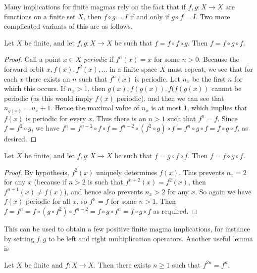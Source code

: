 Many implications for finite magmas rely on the fact that if $f, g:X \to X$ are functions on a finite set $X$, then $f \circ g = I$ if and only if $g \circ f = I$.  Two more complicated variants of this are as follows.

\begin{lemma}\label{ffg}  \leanok Let $X$ be finite, and let $f, g: X \to X$ be such that $f = f \circ f \circ g$.  Then $f = f \circ g \circ f$.
\end{lemma}

\begin{proof} \leanok Call a point $x \in X$ \emph{periodic} if $f^n(x) = x$ for some $n>0$.  Because the forward orbit $x, f(x), f^2(x), \dots$ in a finite space $X$ must repeat, we see that for each $x$ there exists an $n$ such that $f^n(x)$ is periodic.  Let $n_x$ be the first $n$ for which this occurs.  If $n_x > 1$, then $g(x), f(g(x)), f(f(g(x))$ cannot be periodic (as this would imply $f(x)$ periodic), and then we can see that $n_{g(x)} = n_x + 1$.  Hence the maximal value of $n_x$ is at most $1$, which implies that $f(x)$ is periodic for every $x$.  Thus there is an $n > 1$ such that $f^n = f$.  Since $f = f^2 \circ g$, we have $f^n = f^{n-2} \circ f \circ f = f^{n-2} \circ (f^2 \circ g) \circ f = f^n \circ g \circ f = f \circ g \circ f$, as desired.
\end{proof}

\begin{lemma}\label{gff}  \leanok Let $X$ be finite, and let $f, g: X \to X$ be such that $f = g \circ f \circ f$.  Then $f = f \circ g \circ f$.
\end{lemma}

\begin{proof} \leanok By hypothesis, $f^2(x)$ uniquely determines $f(x)$.  This prevents $n_x = 2$ for any $x$ (because if $n>2$ is such that $f^{n+2}(x) = f^2(x)$, then $f^{n+1}(x) \neq f(x)$), and hence also prevents $n_x > 2$ for any $x$.   So again we have $f(x)$ periodic for all $x$, so $f^n = f$ for some $n>1$.  Then $f = f^n = f \circ (g \circ f^2) \circ f^{n-2} = f \circ g \circ f^n = f \circ g \circ f$ as required.
\end{proof}

This can be used to obtain a few positive finite magma implications, for instance by setting $f,g$ to be left and right multiplication operators.  Another useful lemma is

\begin{lemma}\label{period}  \leanok  Let $X$ be finite and $f: X \to X$.  Then there exists $n \geq 1$ such that $f^{2n} = f^n$.
\end{lemma}

